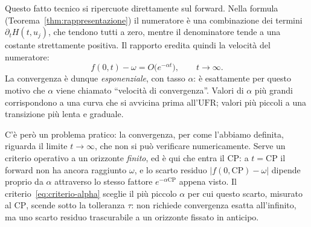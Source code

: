 \documentclass[11pt,a4paper]{article}
\theoremstyle{plain}
\theoremstyle{definition}
\theoremstyle{remark}
\newcommand{\UFR}{\mathrm{UFR}}
\newcommand{\CP}{\mathrm{CP}}
\begin{document}
Questo fatto tecnico si ripercuote direttamente sul forward. Nella formula
(Teorema~\ref{thm:rappresentazione}) il numeratore \`e una combinazione dei termini
$\partial_t H(t,u_j)$, che tendono tutti a zero, mentre il denominatore tende a una costante
strettamente positiva. Il rapporto eredita quindi la velocit\`a del numeratore:
\[
  f(0,t) - \omega = O\!\bigl(e^{-\alpha t}\bigr), \qquad t\to\infty.
\]
La convergenza \`e dunque \emph{esponenziale}, con tasso $\alpha$: \`e esattamente per
questo motivo che $\alpha$ viene chiamato ``velocit\`a di convergenza''. Valori di $\alpha$
pi\`u grandi corrispondono a una curva che si avvicina prima all'$\UFR$; valori pi\`u
piccoli a una transizione pi\`u lenta e graduale.

C'\`e per\`o un problema pratico: la convergenza, per come l'abbiamo definita, riguarda il
limite $t\to\infty$, che non si pu\`o verificare numericamente. Serve un criterio operativo
a un orizzonte \emph{finito}, ed \`e qui che entra il $\CP$: a $t=\CP$ il forward non ha
ancora raggiunto $\omega$, e lo scarto residuo $|f(0,\CP)-\omega|$ dipende proprio da
$\alpha$ attraverso lo stesso fattore $e^{-\alpha \CP}$ appena visto. Il
criterio~\eqref{eq:criterio-alpha} sceglie il pi\`u piccolo $\alpha$ per cui questo scarto,
misurato al $\CP$, scende sotto la tolleranza $\tau$: non richiede convergenza esatta
all'infinito, ma uno scarto residuo trascurabile a un orizzonte fissato in anticipo.

\end{document}
